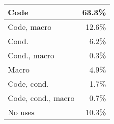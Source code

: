 \begin{tabular}{|l|r|} \hline
Code & 63.3\% \\ \hline
Code, macro & 12.6\% \\
Cond. & 6.2\% \\ \hline
Cond., macro & 0.3\% \\
Macro & 4.9\% \\ \hline
Code, cond. & 1.7\% \\
Code, cond., macro & 0.7\% \\ \hline
No uses & 10.3\% \\ \hline
\end{tabular}

